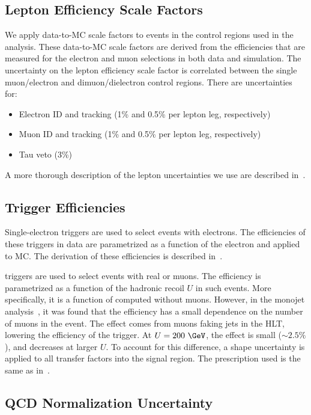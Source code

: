 \subsection{Lepton Efficiency Scale Factors}\label{sec:lep}
We apply data-to-MC scale factors to events in the control regions used in the analysis. These data-to-MC scale factors are derived from the efficiencies that are measured for the electron and muon selections in both data and simulation. The uncertainty on the lepton efficiency scale factor is correlated between the single muon/electron and dimuon/dielectron control regions. There are uncertainties for:
\begin{itemize}
  \item Electron ID and tracking (1\% and 0.5\% per lepton leg, respectively)
  \item Muon ID and tracking (1\% and 0.5\% per lepton leg, respectively)
  \item Tau veto (3\%)
\end{itemize}
A more thorough description of the lepton uncertainties we use are described in~\cite{CMS_AN_2016-473}.

\subsection{Trigger Efficiencies}\label{sec:trigeff}
Single-electron triggers are used to select events with electrons.
The efficiencies of these triggers in data are parametrized as a function of the electron \pt and applied to MC.
The derivation of these efficiencies is described in~\cite{CMS_AN_2016-473}.

\ETmiss triggers are used to select events with real \ETmiss or muons.
The efficiency is parametrized as a function of the hadronic recoil $U$ in such events.
More specifically, it is a function of \ETmiss computed without muons.
However, in the monojet analysis~\cite{CMS_AN_2016-473}, it was found that the efficiency has a small dependence on the number of muons in the event.
The effect comes from muons faking jets in the HLT, lowering the efficiency of the trigger.
At $U=200~\GeV$, the effect is small ($\sim2.5\%$), and decreases at larger $U$.
To account for this difference, a shape uncertainty is applied to all transfer factors into the signal region.
The prescription used is the same as in~\cite{CMS_AN_2016-473}.

\subsection{QCD Normalization Uncertainty}

